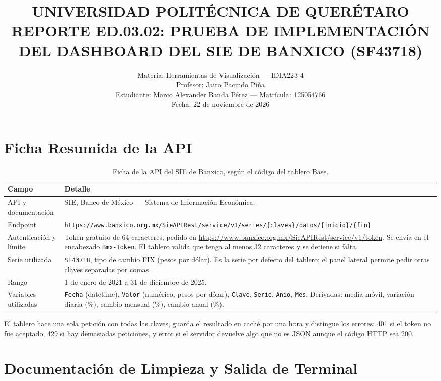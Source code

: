 \documentclass[11pt]{article}
\title{\textbf{UNIVERSIDAD POLITÉCNICA DE QUERÉTARO}\\[4pt]
\Large REPORTE ED.03.02: PRUEBA DE IMPLEMENTACIÓN DEL DASHBOARD DEL SIE DE BANXICO (SF43718)}
\author{Materia: Herramientas de Visualización --- IDIA223-4\\
Profesor: Jairo Pacindo Piña\\
Estudiante: Marco Alexander Banda Pérez --- Matrícula: 125054766\\
Fecha: 22 de noviembre de 2026}
\date{}
\begin{document}
\maketitle

\section{Ficha Resumida de la API}

\begin{table}[h]
\centering
\begin{tabular}{p{3.2cm}p{11.5cm}}
\toprule
\textbf{Campo} & \textbf{Detalle} \\
\midrule
API y documentación & SIE, Banco de México --- Sistema de Información Económica. \\
Endpoint & \texttt{https://www.banxico.org.mx/SieAPIRest/service/v1/series/\{claves\}/datos/\{inicio\}/\{fin\}} \\
Autenticación y límite & Token gratuito de 64 caracteres, pedido en \url{https://www.banxico.org.mx/SieAPIRest/service/v1/token}. Se envía en el encabezado \texttt{Bmx-Token}. El tablero valida que tenga al menos 32 caracteres y se detiene si falta. \\
Serie utilizada & \texttt{SF43718}, tipo de cambio FIX (pesos por dólar). Es la serie por defecto del tablero; el panel lateral permite pedir otras claves separadas por comas. \\
Rango & 1 de enero de 2021 a 31 de diciembre de 2025. \\
Variables utilizadas & \texttt{Fecha} (datetime), \texttt{Valor} (numérico, pesos por dólar), \texttt{Clave}, \texttt{Serie}, \texttt{Anio}, \texttt{Mes}. Derivadas: media móvil, variación diaria (\%), cambio mensual (\%), cambio anual (\%). \\
\bottomrule
\end{tabular}
\caption{Ficha de la API del SIE de Banxico, según el código del tablero Base.}
\end{table}

El tablero hace una sola petición con todas las claves, guarda el
resultado en caché por una hora y distingue los errores: 401 si el token
no fue aceptado, 429 si hay demasiadas peticiones, y error si el servidor
devuelve algo que no es JSON aunque el código HTTP sea 200.

\section{Documentación de Limpieza y Salida de Terminal}
\end{document}
